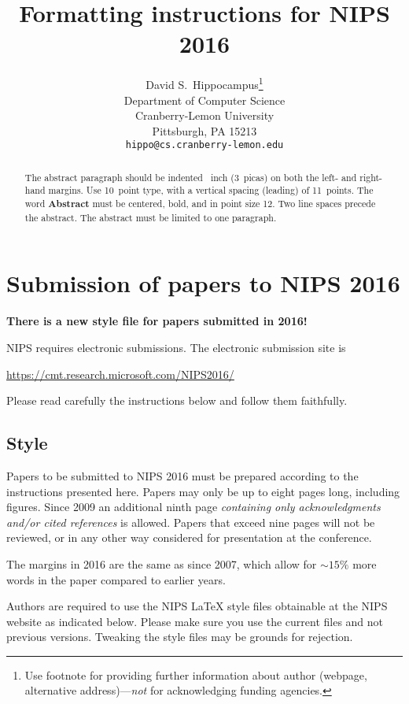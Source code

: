 \documentclass{article}
\title{Formatting instructions for NIPS 2016}
\author{
  David S.~Hippocampus\thanks{Use footnote for providing further
    information about author (webpage, alternative
    address)---\emph{not} for acknowledging funding agencies.} \\
  Department of Computer Science\\
  Cranberry-Lemon University\\
  Pittsburgh, PA 15213 \\
  \texttt{hippo@cs.cranberry-lemon.edu} \\
}
\begin{document}

\maketitle

\begin{abstract}
  The abstract paragraph should be indented ~inch
  (3~picas) on both the left- and right-hand margins. Use 10~point
  type, with a vertical spacing (leading) of 11~points.  The word
  \textbf{Abstract} must be centered, bold, and in point size 12. Two
  line spaces precede the abstract. The abstract must be limited to
  one paragraph.
\end{abstract}

\section{Submission of papers to NIPS 2016}

\textbf{There is a new style file for papers submitted in 2016!}

NIPS requires electronic submissions.  The electronic submission site
is
\begin{center}
  \url{https://cmt.research.microsoft.com/NIPS2016/}
\end{center}

Please read carefully the instructions below and follow them
faithfully.

\subsection{Style}

Papers to be submitted to NIPS 2016 must be prepared according to the
instructions presented here. Papers may only be up to eight pages
long, including figures. Since 2009 an additional ninth page
\emph{containing only acknowledgments and/or cited references} is
allowed. Papers that exceed nine pages will not be reviewed, or in any
other way considered for presentation at the conference.

The margins in 2016 are the same as since 2007, which allow for
$\sim$$15\%$ more words in the paper compared to earlier years.

Authors are required to use the NIPS \LaTeX{} style files obtainable
at the NIPS website as indicated below. Please make sure you use the
current files and not previous versions. Tweaking the style files may
be grounds for rejection.
\end{document}
